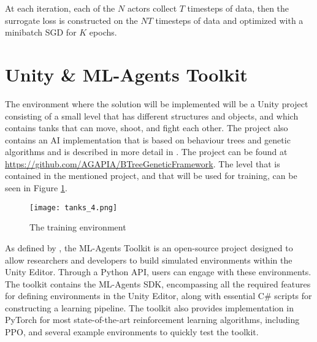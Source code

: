 At each iteration, each of the $N$ actors collect $T$ timesteps of data, then the surrogate loss is constructed on the $NT$ timesteps of data and optimized with a  minibatch SGD for $K$ epochs.


\section{Unity \& ML-Agents Toolkit}

The environment where the solution will be implemented will be a Unity project consisting of a small level that has different structures and objects, and which contains tanks that can move, shoot, and fight each other. The project also contains an AI implementation that is based on behaviour trees and genetic algorithms and is described in more detail in \cite{paduraru2019automatic}. The project can be found at \url{https://github.com/AGAPIA/BTreeGeneticFramework}. The level that is contained in the mentioned project, and that will be used for training, can be seen in Figure \ref{photo:tank_training_env}.

\begin{figure}
    \begin{center}
        \texttt{[image: tanks\_4.png]}
        \caption{The training environment}
        \label{photo:tank_training_env}
    \end{center}
\end{figure}

As defined by \cite{juliani2020unityai}, the ML-Agents Toolkit is an open-source project designed to allow researchers and developers to build simulated environments within the Unity Editor. Through a Python API, users can engage with these environments. The toolkit contains the ML-Agents SDK, encompassing all the required features for defining environments in the Unity Editor, along with essential C\# scripts for constructing a learning pipeline. The toolkit also provides implementation in PyTorch for most state-of-the-art reinforcement learning algorithms, including PPO, and several example environments to quickly test the toolkit.

